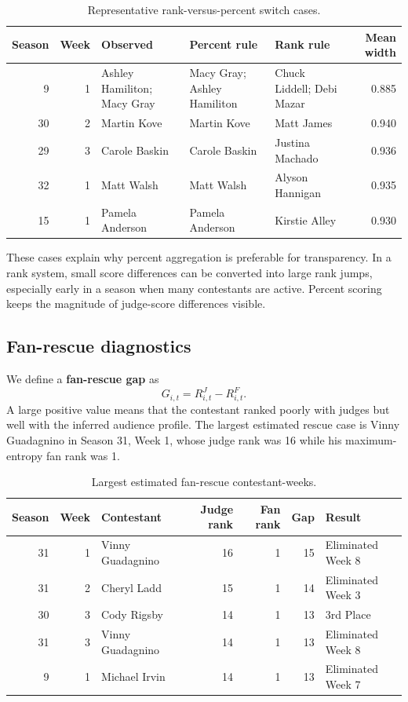 \documentclass[12pt]{article}
\begin{document}
\begin{table}[!htbp]
  \centering
  \caption{Representative rank-versus-percent switch cases.}
  \label{tab:switch-cases}
  \begin{tabularx}{0.98\linewidth}{rrXXXr}
    \toprule
    Season & Week & Observed & Percent rule & Rank rule & Mean width \\
    \midrule
    9 & 1 & Ashley Hamiliton; Macy Gray & Macy Gray; Ashley Hamiliton & Chuck Liddell; Debi Mazar & 0.885 \\
    30 & 2 & Martin Kove & Martin Kove & Matt James & 0.940 \\
    29 & 3 & Carole Baskin & Carole Baskin & Justina Machado & 0.936 \\
    32 & 1 & Matt Walsh & Matt Walsh & Alyson Hannigan & 0.935 \\
    15 & 1 & Pamela Anderson & Pamela Anderson & Kirstie Alley & 0.930 \\
    \bottomrule
  \end{tabularx}
\end{table}

These cases explain why percent aggregation is preferable for transparency. In
a rank system, small score differences can be converted into large rank jumps,
especially early in a season when many contestants are active. Percent scoring
keeps the magnitude of judge-score differences visible.

\subsection{Fan-rescue diagnostics}

We define a \textbf{fan-rescue gap} as
\[
  G_{i,t}=R^J_{i,t}-R^F_{i,t}.
\]
A large positive value means that the contestant ranked poorly with judges but
well with the inferred audience profile. The largest estimated rescue case is
Vinny Guadagnino in Season 31, Week 1, whose judge rank was 16 while his
maximum-entropy fan rank was 1.

\begin{table}[!htbp]
  \centering
  \caption{Largest estimated fan-rescue contestant-weeks.}
  \label{tab:fan-rescue}
  \begin{tabular}{rrlrrrl}
    \toprule
    Season & Week & Contestant & Judge rank & Fan rank & Gap & Result \\
    \midrule
    31 & 1 & Vinny Guadagnino & 16 & 1 & 15 & Eliminated Week 8 \\
    31 & 2 & Cheryl Ladd & 15 & 1 & 14 & Eliminated Week 3 \\
    30 & 3 & Cody Rigsby & 14 & 1 & 13 & 3rd Place \\
    31 & 3 & Vinny Guadagnino & 14 & 1 & 13 & Eliminated Week 8 \\
    9 & 1 & Michael Irvin & 14 & 1 & 13 & Eliminated Week 7 \\
    \bottomrule
  \end{tabular}
\end{table}
\end{document}

